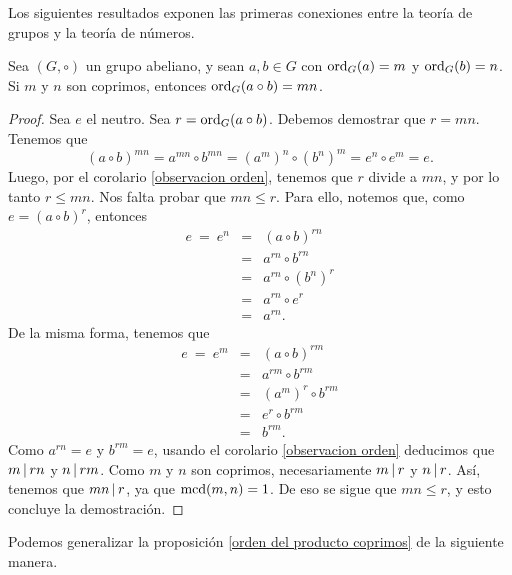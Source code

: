 Los siguientes resultados exponen las primeras conexiones entre la teoría de grupos y la teoría de números.

\begin{prop}\label{orden del producto coprimos}
	Sea $(G,\circ)$ un grupo abeliano, y sean $a,b\in G$ con $\mathrm{ord}_{G}(a)=m$ y $\mathrm{ord}_{G}(b)=n$. Si $m$ y $n$ son coprimos, entonces $\mathrm{ord}_{G}(a\circ b)=mn$.
\end{prop}

\begin{proof}
	Sea $e$ el neutro. Sea $r=\mathrm{ord}_{G}(a\circ b)$. Debemos demostrar que $r = mn$. Tenemos que 
	$$(a\circ b)^{mn} = a^{mn}\circ b^{mn} = (a^m)^n\circ (b^n)^m = e^n\circ e^m = e.$$
Luego, por el corolario \ref{observacion orden}, tenemos que $r$ divide a $mn$, y por lo tanto $r\leq mn$. Nos falta probar que $mn\leq r$. Para ello, notemos que, como $e = (a\circ b)^r$, entonces
\begin{eqnarray*}
	 e \ = \ e^n & =&  (a\circ b)^{rn} \\
	 & = & a^{rn} \circ b^{rn}\\
	 & = & a^{rn} \circ (b^{n})^{r}\\
	 & = & a^{rn} \circ e^{r}\\
	 &=& a^{rn}.
\end{eqnarray*}
 De la misma forma, tenemos que
\begin{eqnarray*}
	 e \ = \ e^m & =&  (a\circ b)^{rm} \\
	 & = & a^{rm} \circ b^{rm}\\
	 & = & (a^{m})^r \circ b^{rm}\\
	 & = & e^{r} \circ b^{rm}\\
	 &=& b^{rm}.
\end{eqnarray*}
Como $a^{rn}=e$ y $b^{rm} = e$, usando el corolario \ref{observacion orden} deducimos que $m \hspace{1.8pt}|\hspace{1.8pt} rn$ y $n\hspace{1.8pt}|\hspace{1.8pt} rm$. Como $m$ y $n$ son coprimos, necesariamente $m \hspace{1.8pt}|\hspace{1.8pt} r$ y $n\hspace{1.8pt}|\hspace{1.8pt} r$. Así, tenemos que $mn\hspace{1.8pt}|\hspace{1.8pt} r$, ya que ${\rm mcd}(m,n)=1$. De eso se sigue que $mn \leq r$, y esto concluye la demostración. 
\end{proof}

Podemos generalizar la proposición \ref{orden del producto coprimos} de la siguiente manera. 

